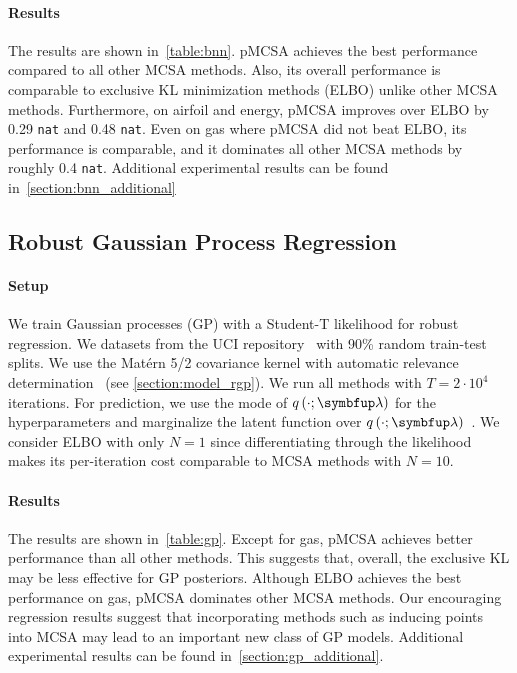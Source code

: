 \vspace{-0.1in}
\paragraph{Results}
The results are shown in~\cref{table:bnn}.
pMCSA achieves the best performance compared to all other MCSA methods.
Also, its overall performance is comparable to exclusive KL minimization methods (ELBO) unlike other MCSA methods.
Furthermore, on \textsf{airfoil} and \textsf{energy}, pMCSA improves over ELBO by 0.29 \texttt{nat} and 0.48 \texttt{nat}.
Even on \textsf{gas} where pMCSA did not beat ELBO, its performance is comparable, and it dominates all other MCSA methods by roughly 0.4 \texttt{nat}.
Additional experimental results can be found in~\cref{section:bnn_additional}

  \vspace{-0.1in}
\subsection{Robust Gaussian Process Regression}\label{section:bgp}
  \vspace{-0.07in}
\paragraph{Setup}
We train Gaussian processes (GP) with a Student-T likelihood for robust regression.
We datasets from the UCI repository~\citep{Dua:2019} with 90\% random train-test splits.
We use the Mat\'ern 5/2 covariance kernel with automatic relevance determination~\citep{neal_bayesian_1996} (see \cref{section:model_rgp}).
We run all methods with \(T=2\cdot10^4\) iterations.
For prediction, we use the mode of \(q\left(\cdot; \vlambda\right)\) for the hyperparameters and marginalize the latent function over \(q\left(\cdot; \vlambda\right)\)~\citep{rasmussen_gaussian_2006}.
We consider ELBO with only \(N=1\) since differentiating through the likelihood makes its per-iteration cost comparable to MCSA methods with \(N=10\).

\vspace{-0.1in}
\paragraph{Results}
The results are shown in~\cref{table:gp}.
Except for \textsf{gas}, pMCSA achieves better performance than all other methods.
This suggests that, overall, the exclusive KL may be less effective for GP posteriors.
Although ELBO achieves the best performance on \textsf{gas}, pMCSA dominates other MCSA methods.
Our encouraging regression results suggest that incorporating methods such as inducing points~\citep{NIPS2005_4491777b} into MCSA may lead to an important new class of GP models.
Additional experimental results can be found in~\cref{section:gp_additional}.

